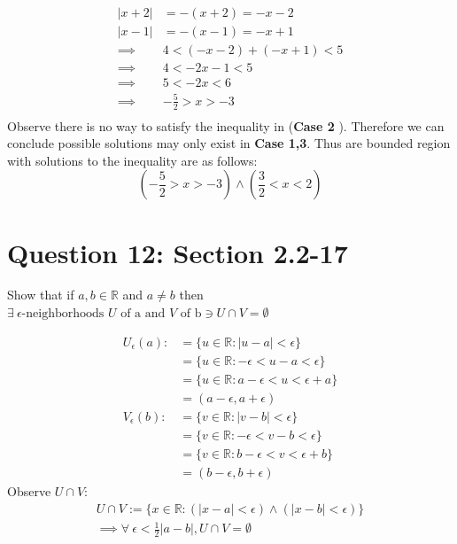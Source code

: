 \documentclass[11pt]{article}
\theoremstyle{plain}
\begin{document}
\[
	\begin{aligned}
		|x+2|    & = -(x+2) = -x-2        \\
		|x-1|    & = -(x-1) = -x+1        \\
		\implies & 4 <(-x-2) + (-x+1) < 5 \\
		\implies & 4 < -2x-1 < 5          \\
		\implies & 5 < -2x < 6            \\
		\implies & -\frac{5}{2} > x > -3  \\
	\end{aligned}
\]
Observe there is no way to satisfy the inequality in (\textbf{Case 2} ). Therefore we can conclude possible solutions may only exist in \textbf{Case 1,3}.
Thus are bounded region with solutions to the inequality are as follows:
\[
	(-\frac{5}{2} > x > -3) \land (\frac{3}{2} < x < 2)
\]
\section*{Question 12: Section 2.2-17}
\begin{center}
	Show that if $a,b \in \mathbb{R}$ and $a \neq b$ then $\exists ~\epsilon \text{-neighborhoods } U \text{ of a and } V \text{ of b} \ni U \cap V = \emptyset$
\end{center}
\[
	\begin{aligned}
		U_{\epsilon}(a):
		 & = \{u \in \mathbb{R} : |u-a| < \epsilon \}            \\
		 & = \{u \in \mathbb{R} : -\epsilon < u-a < \epsilon \}  \\
		 & = \{u \in \mathbb{R} : a-\epsilon < u < \epsilon+a \} \\
		 & = (a-\epsilon, a+\epsilon)                            \\
		V_{\epsilon}(b):
		 & = \{v \in \mathbb{R} : |v-b| < \epsilon \}            \\
		 & = \{v \in \mathbb{R} : -\epsilon < v-b < \epsilon \}  \\
		 & = \{v \in \mathbb{R} : b-\epsilon < v < \epsilon+b \} \\
		 & = (b-\epsilon, b+\epsilon)
	\end{aligned}
\]
Observe $U \cap V$:
\[
	\begin{aligned}
		U \cap V := \{ x \in \mathbb{R} : (|x-a| < \epsilon) \land (|x-b| < \epsilon) \} \\
		\implies \forall ~\epsilon < \frac{1}{2}|a-b|, U \cap V = \emptyset
	\end{aligned}
\]
\end{document}
